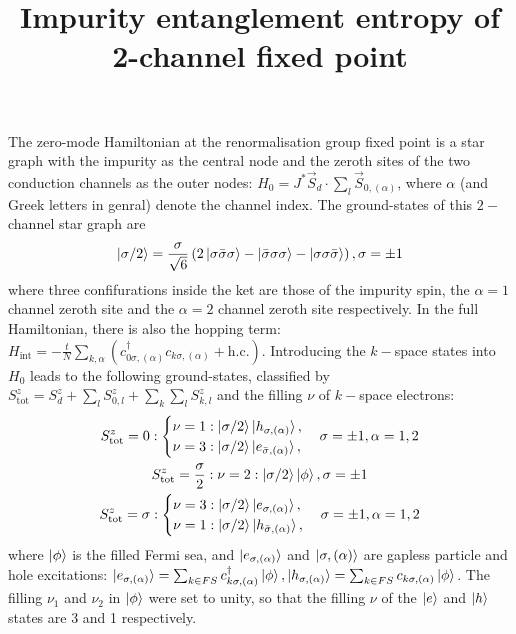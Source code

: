\documentclass{revtex4-2}
\begin{document}
\title{Impurity entanglement entropy of 2-channel fixed point}
\maketitle
The zero-mode Hamiltonian at the renormalisation group fixed point is a star graph with the impurity as the central node and the zeroth sites of the two conduction channels as the outer nodes: \(H_0 = J^*\vec{S}_d\cdot\sum_{l} \vec{S}_{0,(\alpha)}\), where \(\alpha\) (and Greek letters in genral) denote the channel index. The ground-states of this \(2-\)channel star graph are
\begin{equation}\begin{aligned}
	\ket{\sigma/2} = \frac{\sigma}{\sqrt 6}\left( 2\ket{\sigma \bar\sigma \sigma} - \ket{\bar\sigma \sigma \sigma} - \ket{\sigma \sigma \bar\sigma}\right), \sigma=\pm 1
\end{aligned}\end{equation}
where three confifurations inside the ket are those of the impurity spin, the \(\alpha=1\) channel zeroth site and the \(\alpha=2\) channel zeroth site respectively.
In the full Hamiltonian, there is also the hopping term: \(H_\text{int} = -\frac{t}{N}\sum_{k,\alpha}\left( c^\dagger_{0\sigma,(\alpha)}c_{k\sigma,(\alpha)} + \text{h.c.}\right) \). Introducing the \(k-\)space states into \(H_0\) leads to the following ground-states, classified by \(S_\text{tot}^z = S_d^z + \sum_l S_{0,l}^z + \sum_k \sum_l S_{k,l}^z\) and the filling \(\nu\) of \(k-\)space electrons:
\begin{gather}
	S_\text{tot}^z = 0: \begin{cases}
	\nu=1: \ket{\sigma/2}\ket{h_{\sigma, (\alpha)}},\\
	\nu=3: \ket{\sigma/2}\ket{e_{\bar\sigma, (\alpha)}},\\
	\end{cases} \sigma=\pm 1, \alpha=1,2\\
	S_\text{tot}^z = \frac{\sigma}{2}: \nu=2: \ket{\sigma/2}\ket{\phi}, \sigma=\pm 1\\
	S_\text{tot}^z = \sigma: \begin{cases}
	\nu=3: \ket{\sigma/2}\ket{e_{\sigma, (\alpha)}},\\
	\nu=1: \ket{\sigma/2}\ket{h_{\bar\sigma, (\alpha)}},
	\end{cases}  \sigma=\pm 1, \alpha=1,2
\end{gather}
where \(\ket{\phi}\) is the filled Fermi sea, and \(\ket{e_{\sigma, (\alpha)}}\) and \(\ket{\sigma, (\alpha)}\) are gapless particle and hole excitations: \(\ket{e_{\sigma, (\alpha)}} = \sum_{k \in FS} c^\dagger_{k\sigma,(\alpha)}\ket{\phi}, \ket{h_{\sigma, (\alpha)}} = \sum_{k \in FS} c_{k\sigma,(\alpha)}\ket{\phi}\). The filling \(\nu_1\) and \(\nu_2\) in \(\ket{\phi}\) were set to unity, so that the filling \(\nu\) of the \(\ket{e}\) and \(\ket{h}\) states are 3 and 1 respectively.
\end{document}
